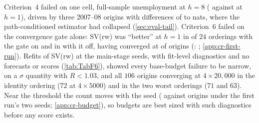 Criterion~4 failed on one cell, full-sample unemployment at $h = 8$ ( against
 at $h = 1$), driven by three 2007--08 origins with differences of
 to  nats, where the path-conditioned estimator had collapsed
(\cref{sec:eval-tail}). Criterion~6 failed on the convergence gate alone: SV(rw) was ``better'' at
$h = 1$ in  of $24$ orderings with the gate on and in  with it off, having
converged at  of origins (: ;
\cref{app:cr-first-run}). %
Refits of SV(rw) at the main-stage seeds, with fit-level diagnostics and no forecasts or scores
(\cref{tab:TabF6}), showed every base-budget failure to be narrow, on a $\sigma$ quantity with
$\hat R < 1.03$, and all $106$ origins converging at $4 \times 20{,}000$ in the identity ordering
($72$ at $4 \times 5000$) and in the two worst orderings ($71$ and $63$). Near the threshold the
count moves with the seed ( against  origins under the first run's two
seeds; \cref{app:cr-budget}), so budgets are best sized with such diagnostics before any score
exists. %

